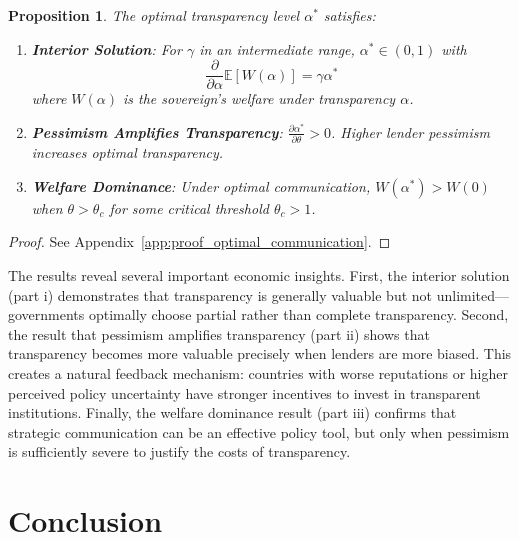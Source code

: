 \documentclass[12pt]{article}
\theoremstyle{plain}
\newtheorem{proposition}{Proposition}
\begin{document}
\begin{proposition}\label{prop:optimal_communication}
	The optimal transparency level $\alpha^*$ satisfies:
	\begin{enumerate}
		\item[\textbf{(i)}] \textbf{Interior Solution}: For $\gamma$ in an intermediate range, $\alpha^* \in (0,1)$ with
		      \begin{equation}
			      \frac{\partial}{\partial \alpha} \mathbb{E}[W(\alpha)] = \gamma \alpha^* \label{eq:foc_transparency}
		      \end{equation}
		      where $W(\alpha)$ is the sovereign's welfare under transparency $\alpha$.
		\item[\textbf{(ii)}] \textbf{Pessimism Amplifies Transparency}: $\frac{\partial \alpha^*}{\partial \theta} > 0$. Higher lender pessimism increases optimal transparency.
		\item[\textbf{(iii)}] \textbf{Welfare Dominance}: Under optimal communication, $W(\alpha^*) > W(0)$ when $\theta > \theta_c$ for some critical threshold $\theta_c > 1$.
	\end{enumerate}
\end{proposition}

\begin{proof}
	See Appendix~\ref{app:proof_optimal_communication}.
\end{proof}

The results reveal several important economic insights. First, the interior
solution (part i) demonstrates that transparency is generally valuable but not
unlimited---governments optimally choose partial rather than complete
transparency. Second, the result that pessimism amplifies transparency (part
ii) shows that transparency becomes more valuable precisely when lenders are
more biased. This creates a natural feedback mechanism: countries with worse
reputations or higher perceived policy uncertainty have stronger incentives to
invest in transparent institutions. Finally, the welfare dominance result (part
iii) confirms that strategic communication can be an effective policy tool, but
only when pessimism is sufficiently severe to justify the costs of
transparency.

\section{Conclusion}
\end{document}
